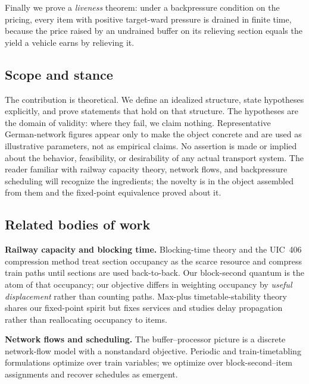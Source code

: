 \documentclass[11pt,twocolumn,a4paper]{article}
\theoremstyle{definition}
\theoremstyle{remark}
\begin{document}
Finally we prove a \emph{liveness} theorem: under a backpressure condition on the pricing, every item with positive target-ward pressure is drained in finite time, because the price raised by an undrained buffer on its relieving section equals the yield a vehicle earns by relieving it.

\subsection{Scope and stance}

The contribution is theoretical. We define an idealized structure, state hypotheses explicitly, and prove statements that hold on that structure. The hypotheses are the domain of validity: where they fail, we claim nothing. Representative German-network figures appear only to make the object concrete and are used as illustrative parameters, not as empirical claims. No assertion is made or implied about the behavior, feasibility, or desirability of any actual transport system. The reader familiar with railway capacity theory, network flows, and backpressure scheduling will recognize the ingredients; the novelty is in the object assembled from them and the fixed-point equivalence proved about it.

\subsection{Related bodies of work}

\textbf{Railway capacity and blocking time.} Blocking-time theory \cite{hansen2008,pachl2021} and the UIC~406 compression method \cite{uic406,abril2008,landex2008} treat section occupancy as the scarce resource and compress train paths until sections are used back-to-back. Our block-second quantum is the atom of that occupancy; our objective differs in weighting occupancy by \emph{useful displacement} rather than counting paths. Max-plus timetable-stability theory \cite{goverde2007} shares our fixed-point spirit but fixes services and studies delay propagation rather than reallocating occupancy to items.

\textbf{Network flows and scheduling.} The buffer--processor picture is a discrete network-flow model \cite{ahuja1993,ford1956,bertsekas1998} with a nonstandard objective. Periodic and train-timetabling formulations \cite{serafini1989,caprara2002,cacchiani2012} optimize over train variables; we optimize over block-second--item assignments and recover schedules as emergent.
\end{document}
